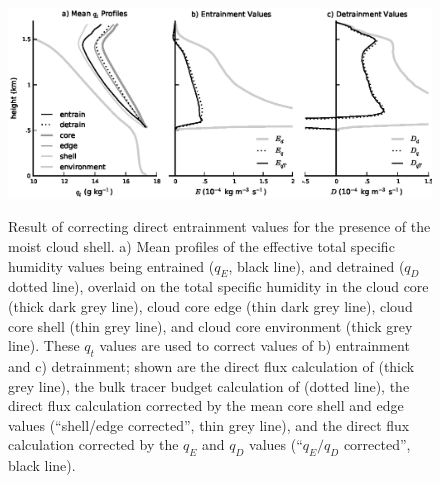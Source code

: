 \documentclass[12pt]{article}
\begin{document}
\begin{figure}[t]
  \noindent\includegraphics[width=39pc,angle=0]{./figures/reynolds_correction}\\
  \caption{Result of correcting direct entrainment values for the presence of 
  the moist cloud shell.  a) Mean profiles of the effective total specific 
  humidity values being entrained ($q_E$, black line), and detrained ($q_D$ dotted 
  line), overlaid on the total specific humidity in the cloud core (thick dark 
  grey line), cloud core edge (thin dark grey line), cloud core shell (thin 
  grey line), and cloud core environment (thick grey line).  These $q_t$ values 
  are used to correct values of b) entrainment and c) detrainment; shown are the 
  direct flux calculation of \cite{Romps2010} (thick grey line), the bulk 
  tracer budget calculation of \cite{Siebesma1995} (dotted line), the direct 
  flux calculation corrected by the mean core shell and edge values (``shell/edge corrected'', thin grey 
  line), and the direct flux calculation corrected by the $q_E$ and $q_D$ 
  values (``$q_E/q_D$ corrected'', black line).}
  \label{fig:Reynolds_correction}
\end{figure}
\end{document}
